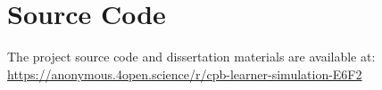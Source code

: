 \chapter{Source Code}
\label{appendix:source-code}

The project source code and dissertation materials are available at:
\url{https://anonymous.4open.science/r/cpb-learner-simulation-E6F2}
